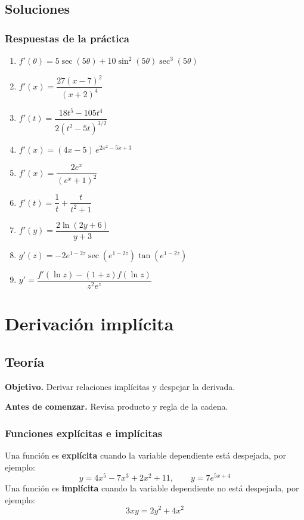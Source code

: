 \documentclass[12pt]{article}
\begin{document}
\subsection{Soluciones}

\subsubsection{Respuestas de la práctica}


\begin{enumerate}
    \item $f'(\theta) = 5\sec(5\theta) + 10\sin^2(5\theta)\sec^3(5\theta)$
    \item $f'(x) = \dfrac{27(x - 7)^2}{(x + 2)^4}$
    \item $f'(t) = \dfrac{18t^5 - 105t^4}{2(t^2 - 5t)^{3/2}}$
    \item $f'(x) = (4x - 5)\,e^{2x^2 - 5x + 3}$
    \item $f'(x) = \dfrac{2e^x}{(e^x + 1)^2}$
    \item $f'(t) = \dfrac{1}{t} + \dfrac{t}{t^2 + 1}$
    \item $f'(y) = \dfrac{2\ln(2y + 6)}{y + 3}$
    \item $g'(z) = -2e^{1 - 2z}\sec\left(e^{1 - 2z}\right)\tan\left(e^{1 - 2z}\right)$
    \item $y' = \dfrac{f'(\ln z) - (1 + z)f(\ln z)}{z^2 e^z}$
\end{enumerate}



\section{Derivación implícita}

\subsection{Teoría}

\textbf{Objetivo.} Derivar relaciones implícitas y despejar la derivada.

\textbf{Antes de comenzar.} Revisa producto y regla de la cadena.

\subsubsection{Funciones explícitas e implícitas}


Una función es \textbf{explícita} cuando la variable dependiente está despejada, por ejemplo:
\[
y = 4x^5 - 7x^3 + 2x^2 + 11, \qquad y = 7e^{5x + 4}
\]
Una función es \textbf{implícita} cuando la variable dependiente no está despejada, por ejemplo:
\[
3xy = 2y^2 + 4x^2
\]
\end{document}
